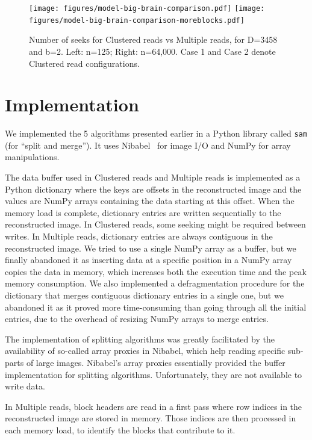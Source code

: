 \documentclass[10pt, conference, compsocconf]{IEEEtran}
\begin{document}
\begin{figure}
  \texttt{[image: figures/model-big-brain-comparison.pdf]}
  \texttt{[image: figures/model-big-brain-comparison-moreblocks.pdf]}
  \caption{Number of seeks for Clustered reads vs Multiple reads, for
    D=3458 and b=2. Left: n=125; Right: n=64,000. Case 1 and Case 2
    denote Clustered read configurations.}
  \label{fig:model-comparison}
\end{figure}

\section{Implementation}
\label{sec:implementation}

We implemented the 5 algorithms presented earlier in a
Python library called \texttt{sam} (for ``split and merge''). It uses
Nibabel~\cite{matthew_brett_2016_60808} for image I/O and NumPy for
array manipulations.

The data buffer used in Clustered reads and Multiple reads is
implemented as a Python dictionary where the keys are offsets in the
reconstructed image and the values are NumPy arrays containing the
data starting at this offset. When the memory load is complete,
dictionary entries are written sequentially to the reconstructed
image. In Clustered reads, some seeking might be required between
writes. In Multiple reads, dictionary entries are always contiguous in
the reconstructed image.  We tried to use a single NumPy array as a
buffer, but we finally abandoned it as inserting data at a specific
position in a NumPy array copies the data in memory, which increases
both the execution time and the peak memory consumption.  We also
implemented a defragmentation procedure for the dictionary that merges
contiguous dictionary entries in a single one, but we abandoned it as
it proved more time-consuming than going through all the initial
entries, due to the overhead of resizing NumPy arrays to merge
entries.

The implementation of splitting algorithms was greatly facilitated by
the availability of so-called array proxies in Nibabel, which help
reading specific sub-parts of large images. Nibabel's array proxies
essentially provided the buffer implementation for splitting
algorithms. Unfortunately, they are not available to write
data. 

In Multiple reads, block headers are read in a first pass where row
indices in the reconstructed image are stored in memory. Those indices
are then processed in each memory load, to identify the blocks that
contribute to it.
\end{document}
